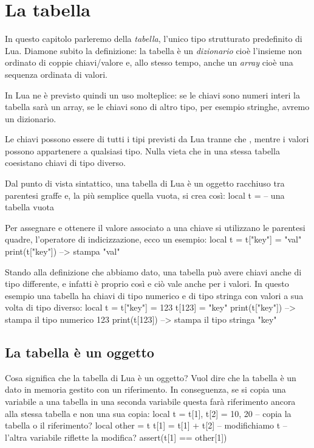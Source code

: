 

\chapter{La tabella}
\label{iChTabella}

In questo capitolo parleremo della \emph{tabella}, l'unico tipo strutturato
predefinito di Lua. Diamone subito la definizione: la tabella è un
\emph{dizionario} cioè l'insieme non ordinato di coppie chiavi/valore e, allo
stesso tempo, anche un \emph{array} cioè una sequenza ordinata di valori.

In Lua ne è previsto quindi un uso molteplice: se le chiavi sono numeri interi
la tabella sarà un array, se le chiavi sono di altro tipo, per esempio stringhe,
avremo un dizionario.

Le chiavi possono essere di tutti i tipi previsti da Lua tranne che ,
mentre i valori possono appartenere a qualsiasi tipo. Nulla vieta che in una
stessa tabella coesistano chiavi di tipo diverso.

Dal punto di vista sintattico, una tabella di Lua è un oggetto racchiuso tra
parentesi graffe e, la più semplice quella vuota, si crea così:
\lines
local t = {} -- una tabella vuota
\endlines
{}

Per assegnare e ottenere il valore associato a una chiave si utilizzano le
parentesi quadre, l'operatore di indicizzazione, ecco un esempio:
\lines
local t = {}
t["key"] = "val"
print(t["key"]) --> stampa "val"
\endlines
{}

Stando alla definizione che abbiamo dato, una tabella può avere chiavi anche di
tipo differente, e infatti è proprio così e ciò vale anche per i valori. In
questo esempio una tabella ha chiavi di tipo numerico e di tipo stringa con
valori a sua volta di tipo diverso:
\lines
local t = {}
t["key"] = 123
t[123] = "key"
print(t["key"]) --> stampa il tipo numerico 123
print(t[123])   --> stampa il tipo stringa "key"
\endlines
{}


\section{La tabella è un oggetto}

Cosa significa che la tabella di Lua è un oggetto? Vuol dire che la tabella è
un dato in memoria gestito con un riferimento. In conseguenza, se si copia una
variabile a una tabella in una seconda variabile questa farà riferimento ancora
alla stessa tabella e non una sua copia:
\lines
local t = {}
t[1], t[2] = 10, 20
-- copia la tabella o il riferimento?
local other = t
t[1] = t[1] + t[2] -- modifichiamo t
-- l'altra variabile riflette la modifica?
assert(t[1] == other[1])
\endlines
{}

